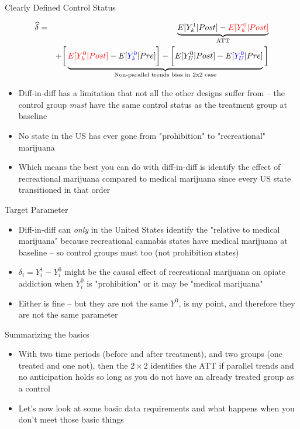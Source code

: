 \documentclass{beamer}
\begin{document}
\begin{frame}{Clearly Defined Control Status}

\begin{eqnarray*}
\widehat{\delta} &=& \underbrace{E[Y^1_k | Post] - \textcolor{red}{E[Y^0_k | Post]}}_{\mathclap{\text{ATT}}} \\
&& + \bigg [  \underbrace{\textcolor{red}{E[Y^0_k | Post]} - E[\textcolor{blue}{Y^0_k} | Pre] \bigg ] - \bigg [ E[Y^0_U | Post] - E[\textcolor{blue}{Y_U^0} | Pre] }_{\mathclap{\text{Non-parallel trends bias in 2x2 case}}} \bigg ]
\end{eqnarray*}

\begin{itemize}
\item Diff-in-diff has a limitation that not all the other designs suffer from -- the control group \emph{must} have the same control status as the treatment group at baseline
\item No state in the US has ever gone from "prohibition" to "recreational" marijuana
\item Which means the best you can do with diff-in-diff is identify the effect of recreational marijuana compared to medical marijuana since every US state transitioned in that order
\end{itemize}

\end{frame}

\begin{frame}{Target Parameter}

\begin{itemize}
\item Diff-in-diff can \emph{only} in the United States identify the "relative to medical marijuana" because recreational cannabis states have medical marijuana at baseline -- so control groups must too (not prohibition states)
\item $\delta_i=Y^1_i - Y^0_i$ might be the causal effect of recreational marijuana on opiate addiction when $Y^0_i$ is "prohibition" or it may be "medical marijuana"
\item Either is fine -- but they are not the same $Y^0$, is my point, and therefore they are not the same parameter
\end{itemize}

\end{frame}



\begin{frame}{Summarizing the basics}

\begin{itemize}
\item With two time periods (before and after treatment), and two groups (one treated and one not), then the $2 \times 2$ identifies the ATT if parallel trends and no anticipation holds so long as you do not have an already treated group as a control
\item Let's now look at some basic data requirements and what happens when you don't meet those basic things

\end{itemize}

\end{frame}
\end{document}
